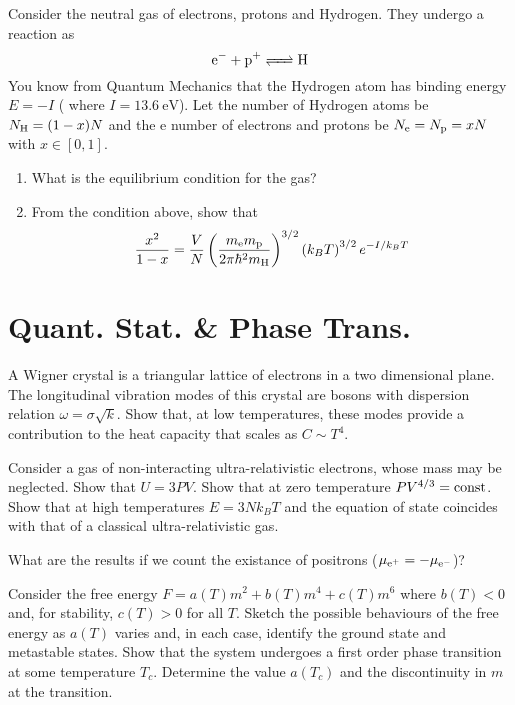\documentclass[CJK]{beamer}
\begin{document}
\begin{frame}
\bch
Consider the neutral gas of electrons, protons and Hydrogen. They undergo a reaction as $$ \ce{e- + p+ <=> H}$$ You know from Quantum Mechanics that the Hydrogen atom
has binding energy $E = -I$ ( where $I = 13.6 \mathrm{\ eV}$). Let the number of Hydrogen atoms
be $N_{\rm H} = (1-x) N$ and the e number of electrons and protons be $N_{\rm e} = N_{\rm p} = xN$ with $x\in [0,1]$.
\begin{enumerate}
\item What is the equilibrium condition for the gas?
\item From the condition above, show that $$\frac{x^{2}}{1-x}=\frac{V}{N}\left(\frac{m_{\rm e} m_{\rm p}}{2 \pi \hbar^{2} m_{\rm H}}\right)^{3 / 2}\left(k_{B} T\right)^{3 / 2} e^{-I / k_{B} T}$$
\end{enumerate}
\ech
\end{frame}

\section{Quant. Stat. \& Phase Trans.}
\begin{frame}
\bch
A Wigner crystal is a triangular lattice of electrons in a two dimensional plane.
The longitudinal vibration modes of this crystal are bosons with dispersion relation $\omega = \sigma \sqrt{k}$. Show that, at low temperatures, these modes provide a contribution to the
heat capacity that scales as $C \sim T^4$.
\ech
\end{frame}

\begin{frame}
\bch
Consider a gas of non-interacting ultra-relativistic electrons, whose mass may be
neglected. Show that $U = 3PV$. Show that
at zero temperature $PV^{4/3} = {\rm const}$. Show that at high temperatures $ E = 3Nk_B T$ and
the equation of state coincides with that of a classical ultra-relativistic gas.
\par
What are the results if we count the existance of positrons ($\mu_{\rm e^+} = -\mu_{\rm e^-}$)?
\ech
\end{frame}

\begin{frame}
\bch
Consider the free energy $F = a(T)m^2 + b(T)m^4 + c(T)m^6$ where $b(T)<0$ and, for stability, $c(T) > 0$ for all $T$. Sketch the possible behaviours
of the free energy as $a(T)$ varies and, in each case, identify the ground state and
metastable states. Show that the system undergoes a first order phase transition at
some temperature $T_c$. Determine the value $a(T_c)$  and the discontinuity in $m$ at the transition.
\ech
\end{frame}
\end{document}
